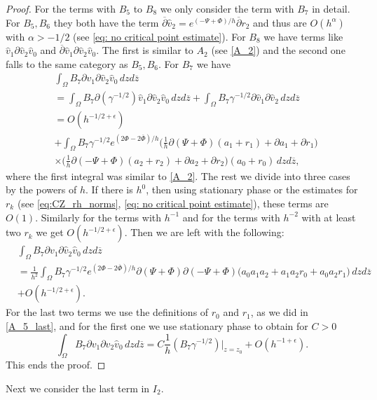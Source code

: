 \documentclass[a4paper, 10pt, twoside, notitlepage]{amsart}
\theoremstyle{plain}
\newcommand{\Om}{\Omega}
\numberwithin{equation}{section}
\newcommand {\p} {\partial}
\newcommand{\e}{\epsilon}
\newcommand{\dbar}{\ol{\p}}
\newcommand{\ol}[1]{\overline{#1}}
\newcommand{\oz}{\overline{z}}
\begin{document}
\begin{proof}
	For the terms with $B_5$ to $B_8$ we only consider the term with $B_7$ in detail. For $B_5, B_6$ they both have the term $\dbar \hat{v}_2 = e^{(-\Psi + \Phi)/h}\dbar r_2$ and thus are $O(h^{\alpha})$ with $\alpha>-1/2$ (see \eqref{eq: no critical point estimate}). For $B_8$ we have terms like $\hat{v}_1\p \hat{v}_2 \hat{v}_0$ and $\dbar \hat{v}_1 \p \hat{v}_2 \hat{v}_0$. The first is similar to $A_2$ (see \eqref{A_2}) and the second one falls to the same category as $B_5, B_6$. For $B_7$ we have
	\begin{align*}
		&\int_{\Om}B_7\p v_1\p \hat{v}_2\hat{v}_0\,dzd\oz\\
		&= \int_{\Om}B_7\p(\gamma^{-1/2})\hat{v}_1\p \hat{v}_2\hat{v}_0\,dzd\oz + \int_{\Om}B_7\gamma^{-1/2}\p \hat{v}_1\p \hat{v}_2\,dzd\oz\\
		&= O(h^{-1/2+\e})\\
		&+ \int_{\Om}B_7\gamma^{-1/2}e^{(2\Phi-2\ol{\Phi})/h}\Big(\frac{1}{h}\p(\Psi + \Phi)(a_1+r_1) + \p a_1 + \p r_1\Big)\\
		&\times \Big(\frac{1}{h}\p(-\Psi + \Phi)(a_2+r_2) + \p a_2 + \p r_2\Big)(a_0+r_0)\,dzd\oz,
	\end{align*}
	where the first integral was similar to \eqref{A_2}. The rest we divide into three cases by the powers of $h$. If there is $h^0$, then using stationary phase or the estimates for $r_k$ (see \eqref{eq:CZ_rh_norms}, \eqref{eq: no critical point estimate}), these terms are $O(1)$. Similarly for the terms with $h^{-1}$ and for the terms with $h^{-2}$ with at least two $r_k$ we get $O(h^{-1/2+\e})$. Then we are left with the following:
	\begin{align*}
		&\int_{\Om}B_7\p v_1\p \hat{v}_2\hat{v}_0\,dzd\oz\\
		&= \frac{1}{h^2}\int_{\Om}B_7\gamma^{-1/2}e^{(2\Phi-2\ol{\Phi})/h}\p(\Psi + \Phi)\p(-\Psi + \Phi)\big(a_0a_1a_2 + a_1a_2r_0 + a_0a_2r_1\big)\,dzd\oz\\
		&+ O(h^{-1/2+\e}).
	\end{align*}
	For the last two terms we use the definitions of $r_0$ and $r_1$, as we did in \eqref{A_5_last}, and for the first one we use stationary phase to obtain for $C>0$
	\begin{equation}\label{B_7}
		\int_{\Om}B_7\p v_1\p \hat{v}_2\hat{v}_0\,dzd\oz = C\frac{1}{h}(B_7\gamma^{-1/2})|_{z=z_0} + O(h^{-1+\e}).
	\end{equation}
	This ends the proof.
\end{proof}

Next we consider the last term in $I_2$.
\end{document}
